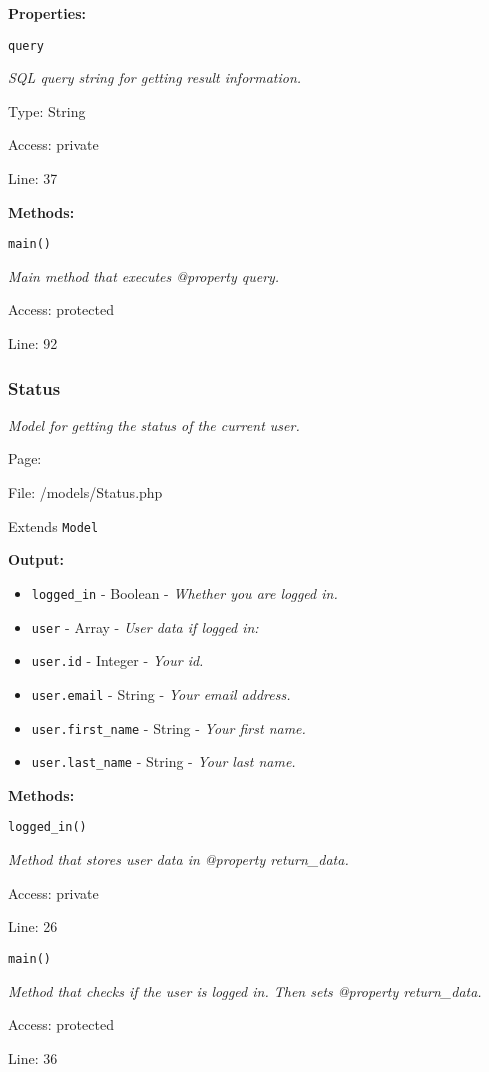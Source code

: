 \textbf{Properties:}

\texttt{query}

{\scriptsize
\textit{SQL query string for getting result information.}

Type: String

Access: private

Line: 37

}
\textbf{Methods:}

\texttt{main()}

{\scriptsize
\textit{Main method that executes @property query.}

Access: protected

Line: 92

}

\subsubsection{Status}\label{Status.php.doc}
\textit{Model for getting the status of the current user.}

Page: \pageref{Status.php}

File: /models/Status.php

Extends \texttt{Model}

\textbf{Output:}
\begin{itemize}
\item \texttt{logged\_in} - Boolean - \textit{Whether you are logged in.}
\item \texttt{user} - Array - \textit{User data if logged in:}
\item \texttt{user.id} - Integer - \textit{Your id.}
\item \texttt{user.email} - String - \textit{Your email address.}
\item \texttt{user.first\_name} - String - \textit{Your first name.}
\item \texttt{user.last\_name} - String - \textit{Your last name.}
\end{itemize}

\textbf{Methods:}

\texttt{logged\_in()}

{\scriptsize
\textit{Method that stores user data in @property return\_data.}

Access: private

Line: 26

}

\texttt{main()}

{\scriptsize
\textit{Method that checks if the user is logged in.
Then sets @property return\_data.}

Access: protected

Line: 36

}

